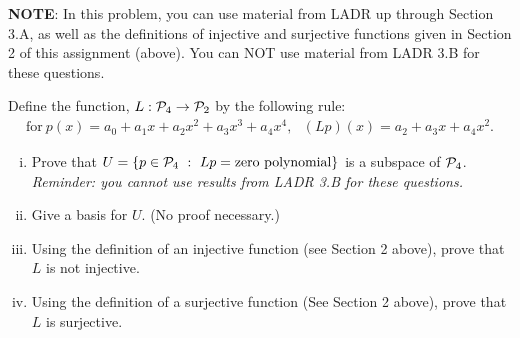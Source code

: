 \begin{question} \noindent \textbf{NOTE}: In this problem, you can use material from LADR up through Section 3.A, as well as the definitions of injective and surjective functions given in Section 2 of this assignment (above). You can NOT use material from LADR 3.B for these questions. \\

	\normalfont

	Define the function, $L:\P_4\to \P_2$ by the following rule:
	\begin{align*}
		\text{for}\ p(x) = a_0 + a_1x + a_2x^2 + a_3x^3 + a_4 x^4,\ \ \
		(Lp)(x) = a_2 + a_3 x + a_4 x^2.
	\end{align*}


	\begin{enumerate}[(i)]

		\item Prove that $U=\{p\in\P_4\ :\ Lp = \text{zero polynomial}\}$ is a subspace of $\P_4$. \\
		      \emph{Reminder: you cannot use results from LADR 3.B for these questions.}

		\item Give a basis for $U$. (No proof necessary.)

		\item Using the definition of an injective function (see Section 2 above), prove that $L$ is not injective.

		\item Using the definition of a surjective function (See Section 2 above), prove that $L$ is surjective.
	\end{enumerate}
\end{question}

